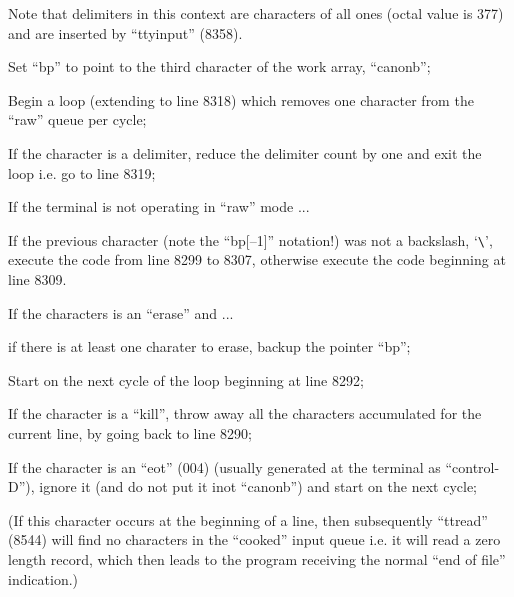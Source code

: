 \noindent Note that delimiters in this context
are characters of all ones (octal value
is 377) and are inserted by ``ttyinput''
(8358).

\bd
\item[8291:] Set ``bp'' to point to the third
character of the work array,
``canonb'';

\item[8292:] Begin a loop (extending to line
8318) which removes one character
from the ``raw'' queue per cycle;

\item[8293:] If the character is a delimiter,
reduce the delimiter count by one
and exit the loop i.e. go to line
8319;

\item[8297:] If the terminal is not operating
in ``raw'' mode ...

\item[8298:] If the previous character (note
the ``bp[--1]'' notation!) was not a
backslash, `\verb+\+', execute the code
from line 8299 to 8307, otherwise
execute the code beginning at
line 8309.
\ed


\bd
\item[8299:] If the characters is an ``erase'' and ...

\item[8300:] if there is at least one charater to
erase, backup the pointer ``bp'';

\item[8302:] Start on the next cycle of the loop
beginning at line 8292;

\item[8304:] If the character is a ``kill'',
throw away all the characters
accumulated for the current line,
by going back to line 8290;

\item[8306:] If the character is an ``eot'' (004)
(usually generated at the terminal as ``control-D''),
ignore it (and do not put it inot ``canonb'') and
start on the next cycle;

(If this character occurs at
the beginning of a line, then
subsequently ``ttread'' (8544) will
find no characters in the
``cooked'' input queue i.e. it will
read a zero length record, which
then leads to the program receiving the normal ``end of file''
indication.)
\ed


